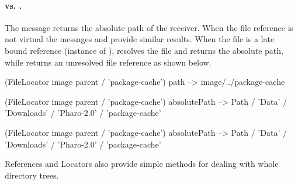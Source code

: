 \documentclass[a4paper,10pt,twoside]{book}
\begin{document}
\paragraph{ vs. .} The message   returns the absolute path of the receiver. When the file reference is not virtual the messages  and  provide similar results.
When the file is a late bound reference (instance of ),  resolves the file and returns the absolute path, while  returns an unresolved file reference as shown below.


\begin{code}{}
(FileLocator image parent / 'package-cache') path
--> {image}/../package-cache

(FileLocator image parent / 'package-cache') absolutePath
--> Path / 'Data' / 'Downloads' / 'Pharo-2.0' / 'package-cache'

(FileLocator image parent / 'package-cache') absolutePath
--> Path / 'Data' / 'Downloads' / 'Pharo-2.0' / 'package-cache'
\end{code}

References and Locators also provide simple methods for dealing with whole directory trees.

%
%
%
%
%
%
%
\end{document}
